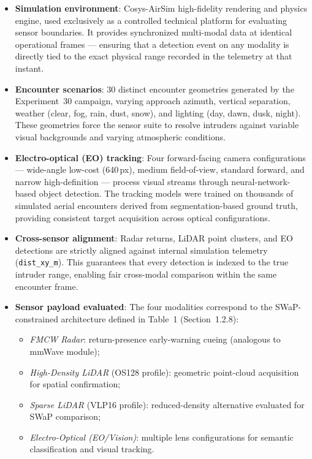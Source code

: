 \begin{itemize}
  \item \textbf{Simulation environment}: Cosys-AirSim \cite{jansen2023cosys} high-fidelity rendering and physics engine, used exclusively as a controlled technical platform for evaluating sensor boundaries. It provides synchronized multi-modal data at identical operational frames --- ensuring that a detection event on any modality is directly tied to the exact physical range recorded in the telemetry at that instant.

  \item \textbf{Encounter scenarios}: 30 distinct encounter geometries generated by the Experiment~30 campaign, varying approach azimuth, vertical separation, weather (clear, fog, rain, dust, snow), and lighting (day, dawn, dusk, night). These geometries force the sensor suite to resolve intruders against variable visual backgrounds and varying atmospheric conditions.

  \item \textbf{Electro-optical (EO) tracking}: Four forward-facing camera configurations --- wide-angle low-cost (640\,px), medium field-of-view, standard forward, and narrow high-definition --- process visual streams through neural-network-based object detection. The tracking models were trained on thousands of simulated aerial encounters derived from segmentation-based ground truth, providing consistent target acquisition across optical configurations.

  \item \textbf{Cross-sensor alignment}: Radar returns, LiDAR point clusters, and EO detections are strictly aligned against internal simulation telemetry (\texttt{dist\_xy\_m}). This guarantees that every detection is indexed to the true intruder range, enabling fair cross-modal comparison within the same encounter frame.

  \item \textbf{Sensor payload evaluated}: The four modalities correspond to the SWaP-constrained architecture defined in Table~1 (Section~1.2.8):
  \begin{itemize}
    \item \emph{FMCW Radar}: return-presence early-warning cueing (analogous to mmWave module);
    \item \emph{High-Density LiDAR} (OS128 profile): geometric point-cloud acquisition for spatial confirmation;
    \item \emph{Sparse LiDAR} (VLP16 profile): reduced-density alternative evaluated for SWaP comparison;
    \item \emph{Electro-Optical (EO/Vision)}: multiple lens configurations for semantic classification and visual tracking.
  \end{itemize}
\end{itemize}

